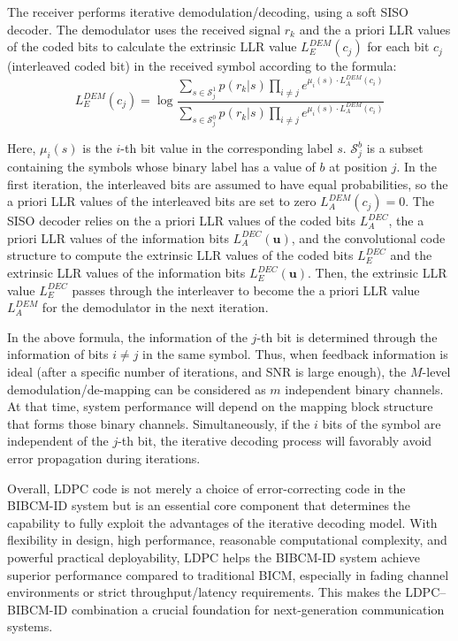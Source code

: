 \documentclass[a4paper,14pt]{extreport}
\begin{document}
The receiver performs iterative demodulation/decoding, using a soft SISO decoder. The demodulator uses the received signal $r_k$ and the a priori LLR values of the coded bits to calculate the extrinsic LLR value $L_E^{DEM}(c_j)$ for each bit $c_j$ (interleaved coded bit) in the received symbol according to the formula:
\begin{equation}
    L_E^{DEM}(c_j) = \log\frac{\sum_{s \in \mathcal{S}_j^1} p(r_k|s) \prod_{i \neq j} e^{\mu_i(s) \cdot L_A^{DEM}(c_i)}}{\sum_{s \in \mathcal{S}_j^0} p(r_k|s) \prod_{i \neq j} e^{\mu_i(s) \cdot L_A^{DEM}(c_i)}}
    \label{eq:llr_extrinsic}
\end{equation}

Here, $\mu_i(s)$ is the $i$-th bit value in the corresponding label $s$. $\mathcal{S}_j^b$ is a subset containing the symbols whose binary label has a value of $b$ at position $j$. In the first iteration, the interleaved bits are assumed to have equal probabilities, so the a priori LLR values of the interleaved bits are set to zero $L_A^{DEM}(c_j) = 0$. The SISO decoder relies on the a priori LLR values of the coded bits $L_A^{DEC}$, the a priori LLR values of the information bits $L_A^{DEC}(\mathbf{u})$, and the convolutional code structure to compute the extrinsic LLR values of the coded bits $L_E^{DEC}$ and the extrinsic LLR values of the information bits $L_E^{DEC}(\mathbf{u})$. Then, the extrinsic LLR value $L_E^{DEC}$ passes through the interleaver to become the a priori LLR value $L_A^{DEM}$ for the demodulator in the next iteration.

In the above formula, the information of the $j$-th bit is determined through the information of bits $i \neq j$ in the same symbol. Thus, when feedback information is ideal (after a specific number of iterations, and SNR is large enough), the $M$-level demodulation/de-mapping can be considered as $m$ independent binary channels. At that time, system performance will depend on the mapping block structure that forms those binary channels. Simultaneously, if the $i$ bits of the symbol are independent of the $j$-th bit, the iterative decoding process will favorably avoid error propagation during iterations.

Overall, LDPC code is not merely a choice of error-correcting code in the BIBCM-ID system but is an essential core component that determines the capability to fully exploit the advantages of the iterative decoding model. With flexibility in design, high performance, reasonable computational complexity, and powerful practical deployability, LDPC helps the BIBCM-ID system achieve superior performance compared to traditional BICM, especially in fading channel environments or strict throughput/latency requirements. This makes the LDPC--BIBCM-ID combination a crucial foundation for next-generation communication systems.
\end{document}
